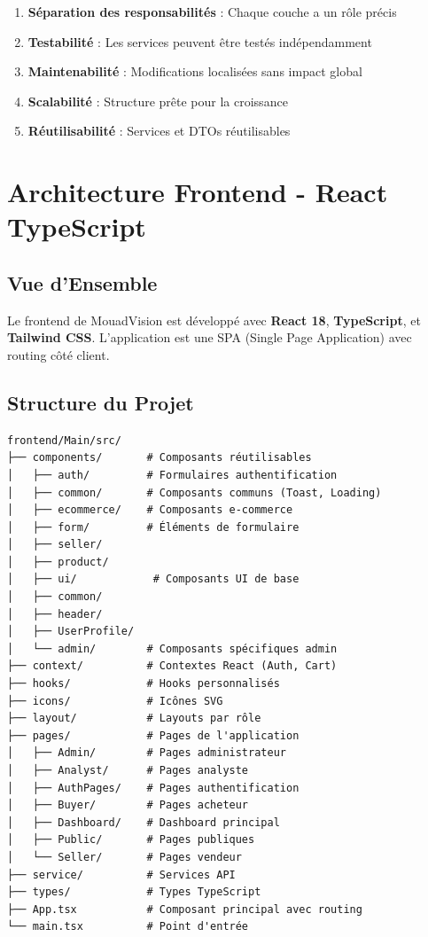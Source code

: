 \documentclass[12pt,a4paper]{report}
\begin{document}
\begin{enumerate}[noitemsep]
    \item \textbf{Séparation des responsabilités} : Chaque couche a un rôle précis
    \item \textbf{Testabilité} : Les services peuvent être testés indépendamment
    \item \textbf{Maintenabilité} : Modifications localisées sans impact global
    \item \textbf{Scalabilité} : Structure prête pour la croissance
    \item \textbf{Réutilisabilité} : Services et DTOs réutilisables
\end{enumerate}

\chapter{Architecture Frontend - React TypeScript}

\section{Vue d'Ensemble}

Le frontend de MouadVision est développé avec \textbf{React 18}, \textbf{TypeScript}, et \textbf{Tailwind CSS}. L'application est une SPA (Single Page Application) avec routing côté client.

\section{Structure du Projet}

\begin{verbatim}
frontend/Main/src/
├── components/       # Composants réutilisables
│   ├── auth/         # Formulaires authentification
│   ├── common/       # Composants communs (Toast, Loading)
│   ├── ecommerce/    # Composants e-commerce
│   ├── form/         # Éléments de formulaire
│   ├── seller/      
│   ├── product/ 
│   ├── ui/            # Composants UI de base
│   ├── common/
│   ├── header/
│   ├── UserProfile/    
│   └── admin/        # Composants spécifiques admin
├── context/          # Contextes React (Auth, Cart)
├── hooks/            # Hooks personnalisés
├── icons/            # Icônes SVG
├── layout/           # Layouts par rôle
├── pages/            # Pages de l'application
│   ├── Admin/        # Pages administrateur
│   ├── Analyst/      # Pages analyste
│   ├── AuthPages/    # Pages authentification
│   ├── Buyer/        # Pages acheteur
│   ├── Dashboard/    # Dashboard principal
│   ├── Public/       # Pages publiques
│   └── Seller/       # Pages vendeur
├── service/          # Services API
├── types/            # Types TypeScript
├── App.tsx           # Composant principal avec routing
└── main.tsx          # Point d'entrée
\end{verbatim}
\end{document}
